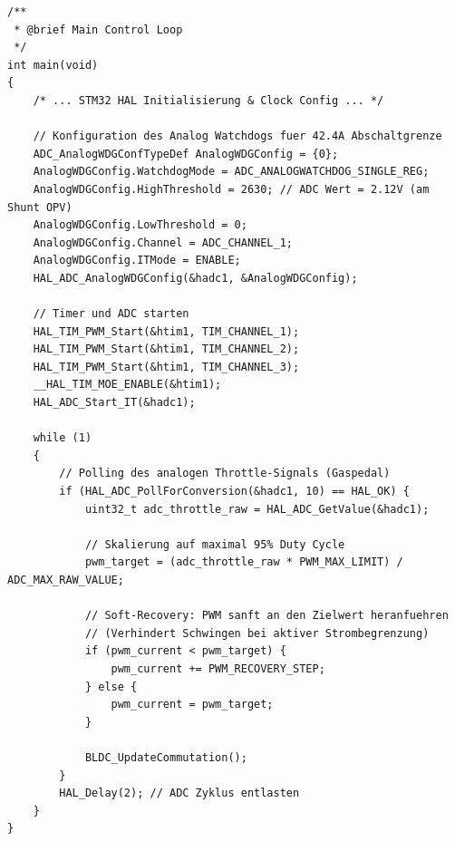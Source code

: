 \begin{lstlisting}[caption={Kernlogik der 6-Step Blockkommutierung und Strombegrenzung}, label={lst:stm32_code}]
/**
 * @brief Main Control Loop
 */
int main(void)
{
    /* ... STM32 HAL Initialisierung & Clock Config ... */
    
    // Konfiguration des Analog Watchdogs fuer 42.4A Abschaltgrenze
    ADC_AnalogWDGConfTypeDef AnalogWDGConfig = {0};
    AnalogWDGConfig.WatchdogMode = ADC_ANALOGWATCHDOG_SINGLE_REG;
    AnalogWDGConfig.HighThreshold = 2630; // ADC Wert = 2.12V (am Shunt OPV)
    AnalogWDGConfig.LowThreshold = 0;
    AnalogWDGConfig.Channel = ADC_CHANNEL_1; 
    AnalogWDGConfig.ITMode = ENABLE;         
    HAL_ADC_AnalogWDGConfig(&hadc1, &AnalogWDGConfig);

    // Timer und ADC starten
    HAL_TIM_PWM_Start(&htim1, TIM_CHANNEL_1);
    HAL_TIM_PWM_Start(&htim1, TIM_CHANNEL_2);
    HAL_TIM_PWM_Start(&htim1, TIM_CHANNEL_3);
    __HAL_TIM_MOE_ENABLE(&htim1);
    HAL_ADC_Start_IT(&hadc1); 

    while (1)
    {
        // Polling des analogen Throttle-Signals (Gaspedal)
        if (HAL_ADC_PollForConversion(&hadc1, 10) == HAL_OK) {
            uint32_t adc_throttle_raw = HAL_ADC_GetValue(&hadc1);

            // Skalierung auf maximal 95% Duty Cycle
            pwm_target = (adc_throttle_raw * PWM_MAX_LIMIT) / ADC_MAX_RAW_VALUE;

            // Soft-Recovery: PWM sanft an den Zielwert heranfuehren 
            // (Verhindert Schwingen bei aktiver Strombegrenzung)
            if (pwm_current < pwm_target) {
                pwm_current += PWM_RECOVERY_STEP; 
            } else {
                pwm_current = pwm_target; 
            }

            BLDC_UpdateCommutation();
        }
        HAL_Delay(2); // ADC Zyklus entlasten
    }
}
\end{lstlisting}